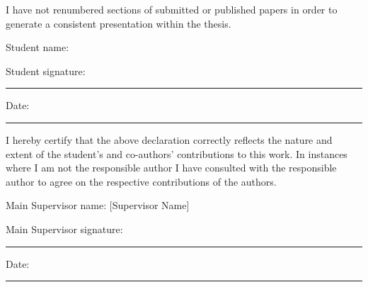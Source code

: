 \bigskip

I have not renumbered sections of submitted or published papers in order to
generate a consistent presentation within the thesis.

\bigskip

\noindent Student name: \thesisauthor

\medskip
\noindent Student signature: \rule{6cm}{0.4pt} \hfill Date: \rule{3cm}{0.4pt}

\bigskip

I hereby certify that the above declaration correctly reflects the nature and
extent of the student's and co-authors' contributions to this work. In
instances where I am not the responsible author I have consulted with the
responsible author to agree on the respective contributions of the authors.

\bigskip

\noindent Main Supervisor name: [Supervisor Name]

\medskip
\noindent Main Supervisor signature: \rule{6cm}{0.4pt} \hfill Date: \rule{3cm}{0.4pt}

\cleardoublepage
